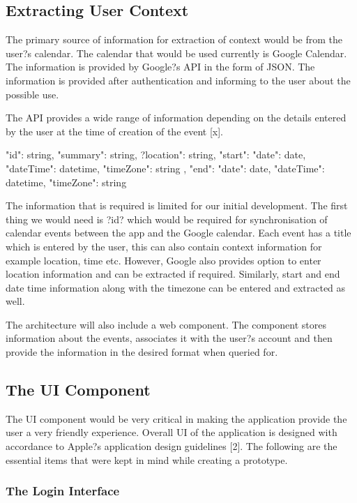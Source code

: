 \documentclass[12pt]{report}
\begin{document}
\subsection{Extracting User Context}

The primary source of information for extraction of context would be from the user?s calendar. The calendar that would be used currently is Google Calendar. The information is provided by Google?s API in the form of JSON. The information is provided after authentication and informing to the user about the possible use.

The API provides a wide range of information depending on the details entered by the user at the time of creation of the event [x].

{
  "id": string,
  "summary": string,
  ?location": string,
"start": {
    "date": date,
    "dateTime": datetime,
    "timeZone": string
  },
  "end": {
    "date": date,
    "dateTime": datetime,
    "timeZone": string
  } 

} 



The information that is required is limited for our initial development. The first thing we would need is ?id? which would be required for synchronisation of calendar events between the app and the Google calendar. 
Each event has a title which is entered by the user, this can also contain context information for example location, time etc. However, Google also provides option to enter location information and can be extracted if required. Similarly, start and end date time information along with the timezone can be entered and extracted as well.


The architecture will also include a web component. The component stores information about the events, associates it with the user?s account and then provide the information in the desired format when queried for.


\subsection{The UI Component}

The UI component would be very critical in making the application provide the user a very friendly experience. Overall UI of the application is designed with accordance to Apple?s application design guidelines [2]. The following are the essential items that were kept in mind while creating a prototype.


\subsubsection{The Login Interface}
\end{document}
